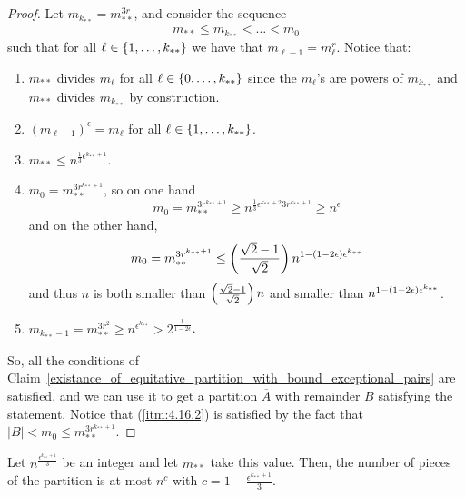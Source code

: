         \begin{proof}
            Let $m_{k_{**}} = m_{**}^{3r}$, and consider the sequence
            \[
                m_{**} \leq m_{k_{**}} < \dots < m_0
            \]
            such that for all $\ell \in \left\{ 1, \dots, k_{**} \right\}$ we have that $m_{\ell-1} = m_\ell^r$.
            Notice that:
            \begin{enumerate}
                \item $m_{**}$ divides $m_\ell$ for all $\ell \in \left\{ 0, \dots, k_{**} \right\}$ since the $m_\ell$'s are powers of $m_{k_{**}}$
                    and $m_{**}$ divides $m_{k_{**}}$ by construction.
                \item $(m_{\ell-1})^\epsilon = m_\ell$ for all $\ell \in \left\{ 1, \dots, k_{**} \right\}$.
                \item $m_{**} \leq n^{\frac{1}{3}\epsilon^{k_{**}+1}}$.
                \item $m_0 = m_{**}^{3r^{k_{**}+1}}$, so on one hand
                    \[
                        m_0 = m_{**}^{3r^{k_{**}+1}} \geq n^{\frac{1}{3}\epsilon^{k_{**}+2} 3r^{k_{**}+1}}
                            \geq n^{\epsilon}
                    \]
                    and on the other hand,
                    \[
                        m_0 = m_{**}^{3r^{k_{**}+1}} \leq \left( \frac{\sqrt{2}-1}{\sqrt{2}} \right) n^{1 - \left( 1 - 2\epsilon \right) \epsilon^{k_{**}}}
                    \]
                    and thus $n$ is both smaller than $\left( \frac{\sqrt{2}-1}{\sqrt{2}} \right) n$ and
                    smaller than $n^{1 - \left( 1 - 2\epsilon \right) \epsilon^{k_{**}}}$.
                \item $m_{k_{**}-1} = m_{**}^{3r^2} \geq n^{\epsilon^{k_{**}}} > 2^{\frac{1}{1-2\epsilon}}$.
            \end{enumerate}
            So, all the conditions of Claim~\ref{existance_of_equitative_partition_with_bound_exceptional_pairs} are satisfied,
            and we can use it to get a partition $\overline{A}$ with remainder $B$ satisfying the statement.
            Notice that (\ref{itm:4.16.2}) is satisfied by the fact that $|B| < m_0 \leq m_{**}^{3r^{k_{**}+1}}$.
        \end{proof}

    \remark
    Let $n^{\frac{\epsilon^{k_{**}+1}}{3}}$ be an integer and let $m_{**}$ take this value.
    Then, the number of pieces of the partition is at most $n^c$ with $c = 1 - \frac{\epsilon^{k_{**}+1}}{3}$.

